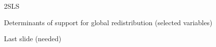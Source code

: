 \documentclass[aspectratio=169,xcolor=dvipsnames, 11pt,mathserif]{beamer}
\begin{document}
\begin{frame}{2SLS \label{2SLS}  \hyperlink{warm_glow}{}}  
  \small 
\end{frame}

\begin{frame}{Determinants of support for global redistribution (selected variables)\label{determinants}  \hyperlink{gcs}{}}  
      \vspace{-.18cm}
    \begin{table}[h]
        \makebox[\textwidth][c]{
            \resizebox*{!}{.97\textheight}{
            
            }
        }
    \end{table} 
\end{frame}

\begin{frame}{Last slide (needed)}
  \end{frame}
\end{document}
